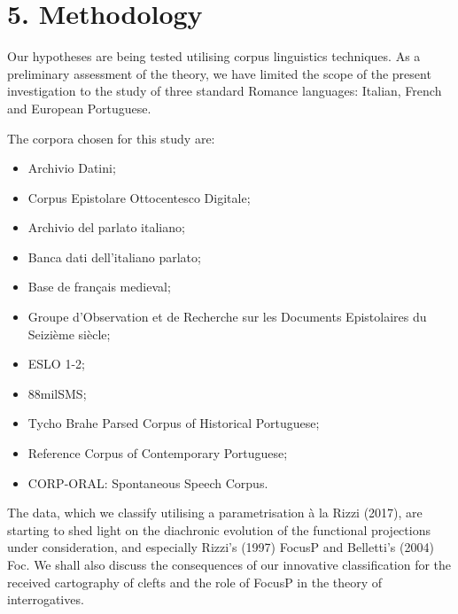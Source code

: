 \documentclass[fleqn,10pt]{wlscirep}
\begin{document}
\section*{5. Methodology}

Our hypotheses are being tested utilising corpus linguistics techniques. 
As a preliminary assessment of the theory, we have limited the scope of the present investigation to the study of three standard Romance languages: Italian, French and European Portuguese. 

The corpora chosen for this study are: 

\begin{itemize}
\item Archivio Datini;
\item \vspace*{-2mm} Corpus Epistolare Ottocentesco Digitale;
\item \vspace*{-2mm} Archivio del parlato italiano;
\item \vspace*{-2mm} Banca dati dell’italiano parlato;
\item \vspace*{-2mm} Base de français medieval;
\item \vspace*{-2mm} Groupe d’Observation et de Recherche sur les Documents Epistolaires du Seizième siècle;
\item \vspace*{-2mm} ESLO 1-2;
\item \vspace*{-2mm} 88milSMS; 
\item \vspace*{-2mm} Tycho Brahe Parsed Corpus of Historical Portuguese;
\item \vspace*{-2mm} Reference Corpus of Contemporary Portuguese;
\item \vspace*{-2mm} CORP-ORAL: Spontaneous Speech Corpus.
\end{itemize}

The data, which we classify utilising a parametrisation à la Rizzi (2017), are starting to shed light on the diachronic evolution of the functional projections under consideration, and especially Rizzi’s (1997) FocusP and Belletti’s (2004) Foc. We shall also discuss the consequences of our innovative classification for the received cartography of clefts and the role of FocusP in the theory of interrogatives. 
\end{document}
